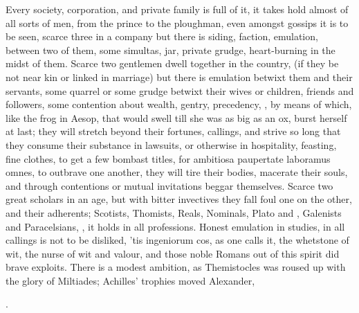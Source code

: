 {{Every society, corporation, and private family is full of it, it takes
hold almost of all sorts of men, from the prince to the ploughman, even
amongst gossips it is to be seen, scarce three in a company but there
is siding, faction, emulation, between two of them, some simultas, jar,
private grudge, heart-burning in the midst of them. Scarce two
gentlemen dwell together in the country, (if they be not near kin or
linked in marriage) but there is emulation betwixt them and their
servants, some quarrel or some grudge betwixt their wives or children,
friends and followers, some contention about wealth, gentry,
precedency, \etc{}, by means of which, like the frog in Aesop, that
would swell till she was as big as an ox, burst herself at last; they
will stretch beyond their fortunes, callings, and strive so long that
they consume their substance in lawsuits, or otherwise in hospitality,
feasting, fine clothes, to get a few bombast titles, for ambitiosa
paupertate laboramus omnes, to outbrave one another, they will tire
their bodies, macerate their souls, and through contentions or mutual
invitations beggar themselves. Scarce two great scholars in an age, but
with bitter invectives they fall foul one on the other, and their
adherents; Scotists, Thomists, Reals, Nominals, Plato and \Aristotle,
Galenists and Paracelsians, \etc{}, it holds in all professions.
Honest emulation in studies, in all callings is not to be
disliked, 'tis ingeniorum cos, as one calls it, the whetstone of wit,
the nurse of wit and valour, and those noble Romans out of this spirit
did brave exploits. There is a modest ambition, as Themistocles was
roused up with the glory of Miltiades; Achilles' trophies moved
Alexander,

.

}}
